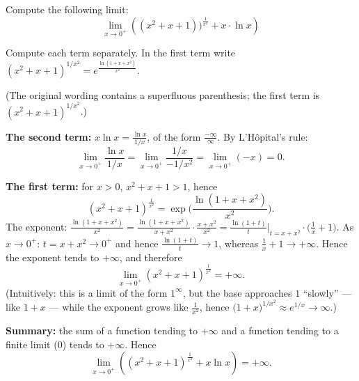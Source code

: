 
\begin{question}
Compute the following limit:
\[ \lim_{x\to0^+}\left((x^2+x+1))^{\frac{1}{x^2}}+x\cdot\ln x\right) \]
\end{question}

\begin{hint}
Compute each term separately. In the first term write $(x^2+x+1)^{1/x^2}=e^{\frac{\ln(1+x+x^2)}{x^2}}$.
\end{hint}

\begin{solution}
(The original wording contains a superfluous parenthesis; the first term is $(x^2+x+1)^{1/x^2}$.)

\textbf{The second term:} $x\ln x=\frac{\ln x}{1/x}$, of the form $\frac{-\infty}{\infty}$. By L'Hôpital's rule:
\[ \lim_{x\to0^+}\frac{\ln x}{1/x}=\lim_{x\to0^+}\frac{1/x}{-1/x^2}=\lim_{x\to0^+}(-x)=0 . \]

\textbf{The first term:} for $x>0$, $x^2+x+1>1$, hence
\[ (x^2+x+1)^{\frac{1}{x^2}}=\exp\Big(\frac{\ln(1+x+x^2)}{x^2}\Big). \]
The exponent: $\frac{\ln(1+x+x^2)}{x^2}=\frac{\ln(1+x+x^2)}{x+x^2}\cdot\frac{x+x^2}{x^2}=\frac{\ln(1+t)}{t}\Big|_{t=x+x^2}\cdot\Big(\frac1x+1\Big)$.
As $x\to0^+$: $t=x+x^2\to0^+$ and hence $\frac{\ln(1+t)}{t}\to1$, whereas $\frac1x+1\to+\infty$. Hence the exponent tends to $+\infty$, and therefore
\[ \lim_{x\to0^+}(x^2+x+1)^{\frac{1}{x^2}}=+\infty . \]
(Intuitively: this is a limit of the form $1^\infty$, but the base approaches $1$ ``slowly'' --- like $1+x$ --- while the exponent grows like $\frac{1}{x^2}$, hence $\big(1+x\big)^{1/x^2}\approx e^{1/x}\to\infty$.)

\textbf{Summary:} the sum of a function tending to $+\infty$ and a function tending to a finite limit ($0$) tends to $+\infty$. Hence
\[ \lim_{x\to0^+}\left((x^2+x+1)^{\frac{1}{x^2}}+x\ln x\right)=\boxed{+\infty} . \]
\end{solution}
